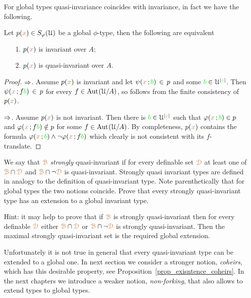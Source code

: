 \documentclass[creche.tex]{subfiles}
\begin{document}
For global types quasi-invariance coincides with invariance, in fact we have the following.


\begin{proposition}\label{prop_invariance-quasi-invariance}
Let $p({\color{brown} x})\in S_{\varphi}(\EuScript U)$ be a global $\phi$-type, then the following are equivalent
\begin{itemize}
\item[1.] $p({\color{brown} x})$ is invariant over $A$;
\item[2.] $p({\color{brown} x})$ is quasi-invariant over $A$.
\end{itemize}
\end{proposition}
\begin{proof}
$\Rightarrow$.
Assume $p({\color{brown} x})$ is invariant and let $\psi({\color{brown} x}\,;{\color{green} b})\,\in\, p$ and some ${\color{green} b}\in\EuScript U^{|{\color{green} z}|}$.
Then $\psi({\color{brown} x}\,;f{\color{green} b})\,\in\, p$ for every $f\in\textrm{Aut\kern.15ex}(\EuScript U/A)$, so  follows from the finite consistency of $p({\color{brown} x})$.

$\Rightarrow$.
Assume $p({\color{brown} x})$ is not invariant.
Then there is ${\color{green} b}\in\EuScript U^{|{\color{green} z}|}$ such that $\varphi({\color{brown} x}\,;{\color{green} b})\in p$ and $\varphi({\color{brown} x}\,;f{\color{green} b})\notin p$ for some  $f\in\textrm{Aut\kern.15ex}(\EuScript U/A)$.
By completeness, $p({\color{brown} x})$ contains the formula $\varphi({\color{brown} x}\,;{\color{green} b})\wedge\neg\varphi({\color{brown} x}\,;f{\color{green} b})$ which clearly is not consistent with its $f$-translate.
\end{proof}

\begin{exercise}
We say that ${\color{brown}\EuScript B}$ \textit{strongly\/} quasi-invariant if for every definable set ${\color{brown}\EuScript D}$ at least one of ${\color{brown}\EuScript B}\cap{\color{brown}\EuScript D}$ and ${\color{brown}\EuScript B}\cap\neg{\color{brown}\EuScript D}$ is quasi-invariant.
Strongly quasi invariant types are defined in analogy to the definition of quasi-invariant type.
Note parenthetically that for global types the two notions coincide.
Prove that every strongly quasi-invariant type has an extension to a global invariant type.

Hint: it may help to prove that if ${\color{brown}\EuScript B}$ is strongly quasi-invariant then for every definable ${\color{brown}\EuScript D}$ either ${\color{brown}\EuScript B}\cap{\color{brown}\EuScript D}$ or ${\color{brown}\EuScript B}\cap\neg{\color{brown}\EuScript D}$ is strongly quasi-invariant.
Then the maximal strongly quasi-invariant set is the required global extension.\QED
\end{exercise}

Unfortunately it is not true in general that every quasi-invariant type can be extended to a global one.
In next section we consider a stronger notion, \textit{coheirs}, which has this desirable property, see Proposition~\ref{prop_exisntence_coheirs}.
In the next chapters we introduce a weaker notion, \textit{non-forking}, that also allows to extend types to global types.
\end{document}
